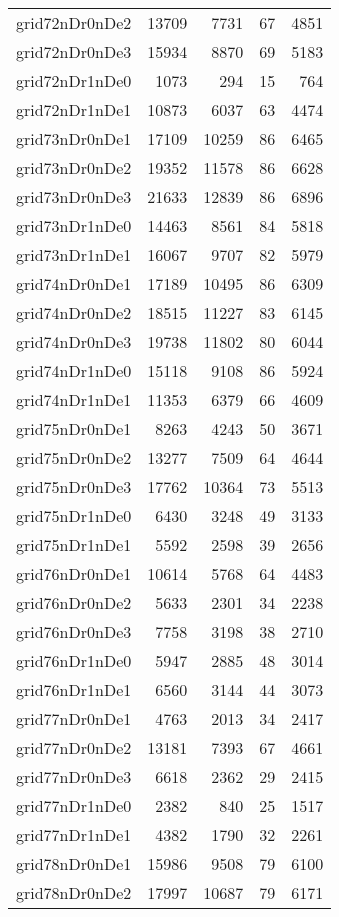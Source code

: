\begin{longtable}{lrrrr}
grid72nDr0nDe2 & 13709 & 7731 & 67 & 4851 \\
grid72nDr0nDe3 & 15934 & 8870 & 69 & 5183 \\
grid72nDr1nDe0 & 1073 & 294 & 15 & 764 \\
grid72nDr1nDe1 & 10873 & 6037 & 63 & 4474 \\
grid73nDr0nDe1 & 17109 & 10259 & 86 & 6465 \\
grid73nDr0nDe2 & 19352 & 11578 & 86 & 6628 \\
grid73nDr0nDe3 & 21633 & 12839 & 86 & 6896 \\
grid73nDr1nDe0 & 14463 & 8561 & 84 & 5818 \\
grid73nDr1nDe1 & 16067 & 9707 & 82 & 5979 \\
grid74nDr0nDe1 & 17189 & 10495 & 86 & 6309 \\
grid74nDr0nDe2 & 18515 & 11227 & 83 & 6145 \\
grid74nDr0nDe3 & 19738 & 11802 & 80 & 6044 \\
grid74nDr1nDe0 & 15118 & 9108 & 86 & 5924 \\
grid74nDr1nDe1 & 11353 & 6379 & 66 & 4609 \\
grid75nDr0nDe1 & 8263 & 4243 & 50 & 3671 \\
grid75nDr0nDe2 & 13277 & 7509 & 64 & 4644 \\
grid75nDr0nDe3 & 17762 & 10364 & 73 & 5513 \\
grid75nDr1nDe0 & 6430 & 3248 & 49 & 3133 \\
grid75nDr1nDe1 & 5592 & 2598 & 39 & 2656 \\
grid76nDr0nDe1 & 10614 & 5768 & 64 & 4483 \\
grid76nDr0nDe2 & 5633 & 2301 & 34 & 2238 \\
grid76nDr0nDe3 & 7758 & 3198 & 38 & 2710 \\
grid76nDr1nDe0 & 5947 & 2885 & 48 & 3014 \\
grid76nDr1nDe1 & 6560 & 3144 & 44 & 3073 \\
grid77nDr0nDe1 & 4763 & 2013 & 34 & 2417 \\
grid77nDr0nDe2 & 13181 & 7393 & 67 & 4661 \\
grid77nDr0nDe3 & 6618 & 2362 & 29 & 2415 \\
grid77nDr1nDe0 & 2382 & 840 & 25 & 1517 \\
grid77nDr1nDe1 & 4382 & 1790 & 32 & 2261 \\
grid78nDr0nDe1 & 15986 & 9508 & 79 & 6100 \\
grid78nDr0nDe2 & 17997 & 10687 & 79 & 6171 \\

\end{longtable}

